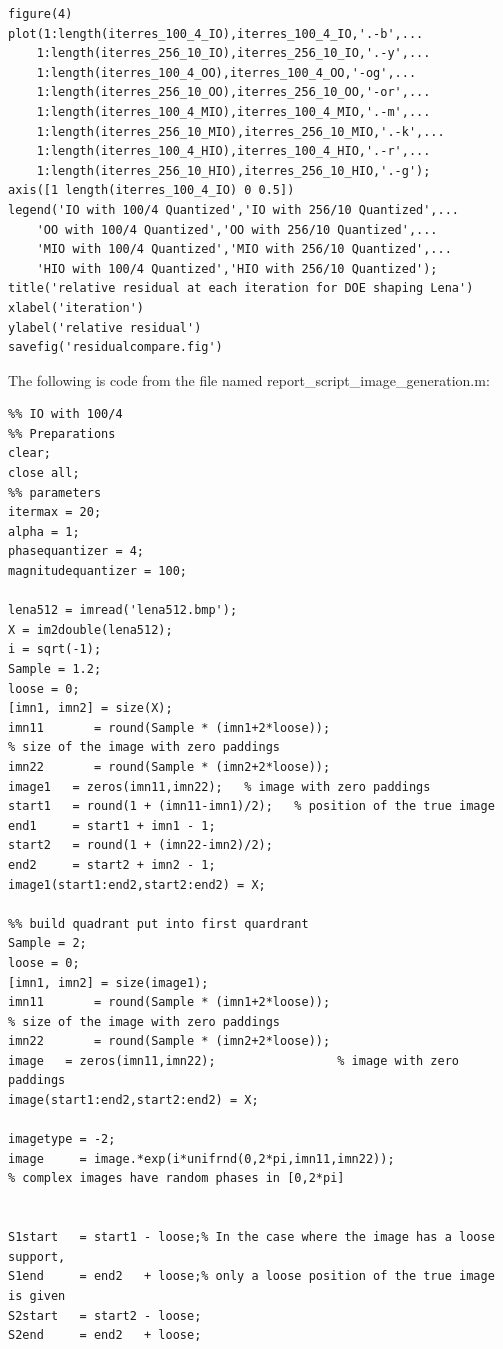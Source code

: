 \documentclass[letter,14pt]{extreport}
\begin{document}
\begin{appendices}
\begin{lstlisting}
figure(4)
plot(1:length(iterres_100_4_IO),iterres_100_4_IO,'.-b',...
    1:length(iterres_256_10_IO),iterres_256_10_IO,'.-y',...
    1:length(iterres_100_4_OO),iterres_100_4_OO,'-og',...
    1:length(iterres_256_10_OO),iterres_256_10_OO,'-or',...
    1:length(iterres_100_4_MIO),iterres_100_4_MIO,'.-m',...
    1:length(iterres_256_10_MIO),iterres_256_10_MIO,'.-k',...
    1:length(iterres_100_4_HIO),iterres_100_4_HIO,'.-r',...
    1:length(iterres_256_10_HIO),iterres_256_10_HIO,'.-g');
axis([1 length(iterres_100_4_IO) 0 0.5])
legend('IO with 100/4 Quantized','IO with 256/10 Quantized',...
    'OO with 100/4 Quantized','OO with 256/10 Quantized',...
    'MIO with 100/4 Quantized','MIO with 256/10 Quantized',...
    'HIO with 100/4 Quantized','HIO with 256/10 Quantized');
title('relative residual at each iteration for DOE shaping Lena')
xlabel('iteration')
ylabel('relative residual')
savefig('residualcompare.fig')
\end{lstlisting}

The following is code from the file named report\_script\_image\_generation.m:

\begin{lstlisting} 
%% IO with 100/4
%% Preparations
clear;
close all;
%% parameters
itermax = 20;
alpha = 1;
phasequantizer = 4;
magnitudequantizer = 100;

lena512 = imread('lena512.bmp');
X = im2double(lena512);
i = sqrt(-1);
Sample = 1.2;
loose = 0;
[imn1, imn2] = size(X);
imn11       = round(Sample * (imn1+2*loose));
% size of the image with zero paddings
imn22       = round(Sample * (imn2+2*loose));
image1   = zeros(imn11,imn22);   % image with zero paddings
start1   = round(1 + (imn11-imn1)/2);   % position of the true image
end1     = start1 + imn1 - 1;
start2   = round(1 + (imn22-imn2)/2);
end2     = start2 + imn2 - 1;
image1(start1:end2,start2:end2) = X;

%% build quadrant put into first quardrant
Sample = 2;
loose = 0;
[imn1, imn2] = size(image1);
imn11       = round(Sample * (imn1+2*loose));
% size of the image with zero paddings
imn22       = round(Sample * (imn2+2*loose));
image   = zeros(imn11,imn22);                 % image with zero paddings
image(start1:end2,start2:end2) = X;

imagetype = -2;
image     = image.*exp(i*unifrnd(0,2*pi,imn11,imn22));
% complex images have random phases in [0,2*pi]


S1start   = start1 - loose;% In the case where the image has a loose support,
S1end     = end2   + loose;% only a loose position of the true image is given
S2start   = start2 - loose;
S2end     = end2   + loose;


\end{lstlisting}
\end{appendices}
\end{document}
